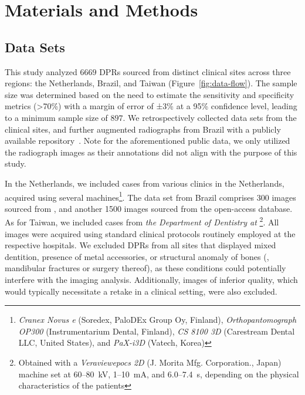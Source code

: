 \section{Materials and Methods}

\subsection{Data Sets}




This study analyzed $\num{6669}$ DPRs sourced from distinct clinical sites across three regions: the Netherlands, Brazil, and Taiwan (Figure~\ref{fig:data-flow}).
The sample size was determined based on the need to estimate the sensitivity and specificity metrics (>70\%) with a margin of error of ±3\% at a 95\% confidence level, leading to a minimum sample size of $\num{897}$.
We retrospectively collected data sets from the clinical sites, and further augmented radiographs from Brazil with a publicly available repository~\citep{silva2018automatic}.
Note for the aforementioned public data, we only utilized the radiograph images as their annotations did not align with the purpose of this study.

In the Netherlands, we included cases from various clinics in the Netherlands, acquired using several machines\footnote{\emph{Cranex Novus e} (Soredex, PaloDEx Group Oy, Finland), \emph{Orthopantomograph OP300} (Instrumentarium Dental, Finland), \emph{CS 8100 3D} (Carestream Dental LLC, United States), and \emph{PaX-i3D} (Vatech, Korea)}.
The data set from Brazil comprises \num{300} images sourced from \emph{\hospitalB}, and another \num{1500} images sourced from the open-access database.
As for Taiwan, we included cases from \emph{the Department of Dentistry at \hospitalT}\footnote{Obtained with a \emph{Veraviewepocs 2D} (J. Morita Mfg. Corporation., Japan) machine set at 60--80~kV, 1--10~mA, and 6.0--7.4~s, depending on the physical characteristics of the patients}.
All images were acquired using standard clinical protocols routinely employed at the respective hospitals.
We excluded DPRs from all sites that displayed mixed dentition, presence of metal accessories, or structural anomaly of bones (\eg, mandibular fractures or surgery thereof), as these conditions could potentially interfere with the imaging analysis.  
Additionally, images of inferior quality, which would typically necessitate a retake in a clinical setting, were also excluded.

